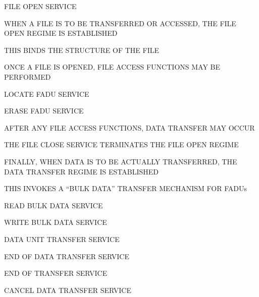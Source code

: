 \begin{bwslide}

\begin{nrtc}
\item	FILE OPEN SERVICE
    \begin{nrtc}
    \item	WHEN A FILE IS TO BE TRANSFERRED OR ACCESSED,
		THE FILE OPEN REGIME IS ESTABLISHED    
    \end{nrtc}

\item	THIS BINDS THE STRUCTURE OF THE FILE

\item	ONCE A FILE IS OPENED,
	FILE ACCESS FUNCTIONS MAY BE PERFORMED
    \begin{nrtc}
    \item	LOCATE FADU SERVICE

    \item	ERASE FADU SERVICE
    \end{nrtc}

\item	AFTER ANY FILE ACCESS FUNCTIONS,
	DATA TRANSFER MAY OCCUR

\item	THE FILE CLOSE SERVICE TERMINATES THE FILE OPEN REGIME
\end{nrtc}
\end{bwslide}


\begin{bwslide}

\begin{nrtc}
\item	FINALLY, WHEN DATA IS TO BE ACTUALLY TRANSFERRED,
	THE DATA TRANSFER REGIME IS ESTABLISHED

\item	THIS INVOKES A ``BULK DATA'' TRANSFER MECHANISM FOR FADUs
    \begin{nrtc}
    \item	READ BULK DATA SERVICE

    \item	WRITE BULK DATA SERVICE

    \item	DATA UNIT TRANSFER SERVICE

    \item	END OF DATA TRANSFER SERVICE

    \item	END OF TRANSFER SERVICE

    \item	CANCEL DATA TRANSFER SERVICE
    \end{nrtc}
\end{nrtc}
\end{bwslide}



